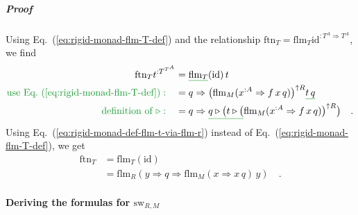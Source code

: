 \subparagraph{Proof}

Using Eq.~(\ref{eq:rigid-monad-flm-T-def}) and the relationship
$\text{ftn}_{T}=\text{flm}_{T}\text{id}^{:T^{A}\Rightarrow T^{A}}$,
we find
\begin{align*}
\text{ftn}_{T}t^{:T^{T^{A}}} & =\gunderline{\text{flm}_{T}}(\text{id})\,t\\
{\color{greenunder}\text{use Eq.~(\ref{eq:rigid-monad-flm-T-def})}:}\quad & =q\Rightarrow\big(\text{flm}_{M}(x^{:A}\Rightarrow f\,x\,q)\big)^{\uparrow R}\gunderline{t\,q}\\
{\color{greenunder}\text{definition of }\triangleright:}\quad & =q\Rightarrow\gunderline{q\triangleright\big(t\triangleright\big(}\text{flm}_{M}(x^{:A}\Rightarrow f\,x\,q)\big)^{\uparrow R}\big)\quad.
\end{align*}
Using Eq.~(\ref{eq:rigid-monad-def-flm-t-via-flm-r}) instead of
Eq.~(\ref{eq:rigid-monad-flm-T-def}), we get
\begin{align*}
\text{ftn}_{T} & =\text{flm}_{T}(\text{id})\\
 & =\text{flm}_{R}\left(y\Rightarrow q\Rightarrow\text{flm}_{M}(x\Rightarrow x\,q)\,y\right)\quad.
\end{align*}


\paragraph{Deriving the formulas for $\text{sw}_{R,M}$}

